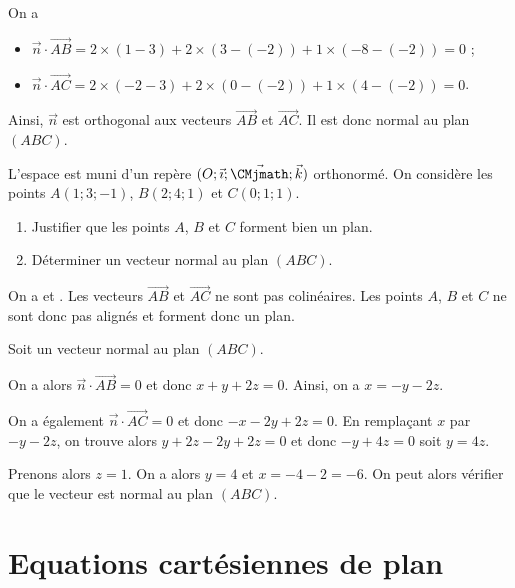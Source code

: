 \documentclass[11pt,fleqn, openany]{book} %
\begin{document}
\begin{solution}On a 
 \begin{itemize}
 \item $\vec n \cdot \overrightarrow{AB} = 2 \times (1-3) + 2 \times (3-(-2))+1 \times (-8-(-2)) = 0$ ;
 \item $\vec n \cdot \overrightarrow{AC} = 2 \times (-2-3) + 2 \times (0-(-2))+1 \times (4-(-2)) = 0$.
 \end{itemize}
 
 Ainsi, $\vec n$ est orthogonal aux vecteurs $\overrightarrow{AB}$ et $\overrightarrow{AC}$. Il est donc normal au plan $(ABC)$.
 \end{solution} 
 
 
 \begin{exercise}[topic=geom13]L'espace est muni d'un repère $(O;\vec{\imath}; \vec{\CMjmath}; \vec k)$ orthonormé. On considère les points $A(1;3;-1)$, $B(2;4;1)$ et $C(0;1;1)$.
 \begin{enumerate}
 \item Justifier que les points $A$, $B$ et $C$ forment bien un plan.
 \item Déterminer un vecteur normal au plan $(ABC)$.
 \end{enumerate}\end{exercise}
 
\begin{solution}
On a  et . Les vecteurs $\overrightarrow{AB}$ et $\overrightarrow{AC}$ ne sont pas colinéaires. Les points $A$, $B$ et $C$ ne sont donc pas alignés et forment donc un plan.

Soit  un vecteur normal au plan $(ABC)$.

On a alors $\vec n \cdot \overrightarrow{AB}=0$ et donc $x+y+2z=0$. Ainsi, on a $x=-y-2z$.

On a également $\vec n \cdot \overrightarrow{AC}=0$ et donc $-x-2y+2z=0$. En remplaçant $x$ par $-y-2z$, on trouve alors $y+2z-2y+2z=0$ et donc $-y+4z=0$ soit $y=4z$.

Prenons alors $z=1$. On a alors $y=4$ et $x=-4-2=-6$. On peut alors vérifier que le vecteur  est normal au plan $(ABC)$.
\end{solution} 





\section*{Equations cartésiennes de plan}
\end{document}
